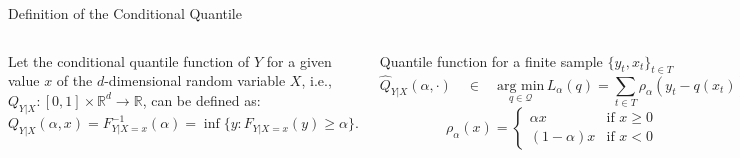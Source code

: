 



\begin{frame}{Definition of the Conditional Quantile}


\begin{columns}


\tiny

Let the conditional quantile function of \(Y\) for a given value \(x\)
of the \(d\)-dimensional random variable \(X\), i.e.,
\(Q_{Y|X}:[0,1] \times \mathbb{R}^d \rightarrow \mathbb{R}\), can be
defined as:
\[Q_{Y|X}(\alpha,x) = F_{Y|X=x}^{-1}(\alpha) = \inf\{y: F_{Y|X=x}(y) \geq \alpha\}.\]

\begin{block}{Quantile function for a finite sample $\{ y_t,x_t \}_{t \in T}$}
    \begin{equation*}
        \hat{Q}_{Y|X}(\alpha,\cdot)\quad\in\quad  \underset{q\in\mathcal{Q}}{\text{arg min}}\, L_\alpha(q) = \sum_{t\in T}\rho_{\alpha}(y_{t}-q(x_t))
    \end{equation*}
    $$
    \rho_{\alpha}(x)=\begin{cases}
        \alpha x & \text{if }x\geq0\\
        (1-\alpha)x & \text{if }x<0
        \end{cases}
    $$
\end{block}


\end{columns}

\end{frame}




